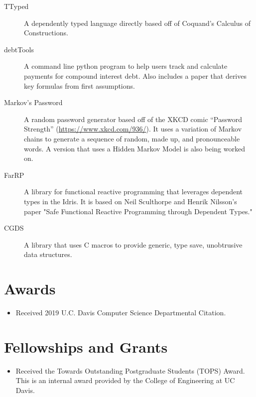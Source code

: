 \documentclass{resume}
\begin{document}
\begin{description}
    \item[TTyped] A dependently typed language directly based off of
        Coquand's Calculus of Constructions.

    \item[debtTools] A command line python program to help users track
        and calculate payments for compound interest debt.
        Also includes a paper that derives key formulas from first
        assumptions.

    \item[Markov's Password] A random password generator based off of
        the XKCD comic ``Password Strength''
        (\url{https://www.xkcd.com/936/}).
        It uses a variation of Markov chains to generate a sequence of
        random, made up, and pronounceable words.
        A version that uses a Hidden Markov Model is also being worked
        on.

    \item[FarRP] A library for functional reactive programming that
        leverages dependent types in the Idris.
        It is based on Neil Sculthorpe and Henrik Nilsson's paper "Safe
        Functional Reactive Programming through Dependent Types."

    \item[CGDS] A library that uses C macros to provide generic, type save,
        unobtrusive data structures.
\end{description}


\section*{Awards}

\begin{itemize}
    \item Received 2019 U.C. Davis Computer Science Departmental Citation.
\end{itemize}

\section*{Fellowships and Grants}

\begin{itemize}
\item Received the Towards Outstanding Postgraduate Students (TOPS) Award.
  This is an internal award provided by the College of Engineering at UC Davis.
\end{itemize}
\end{document}
